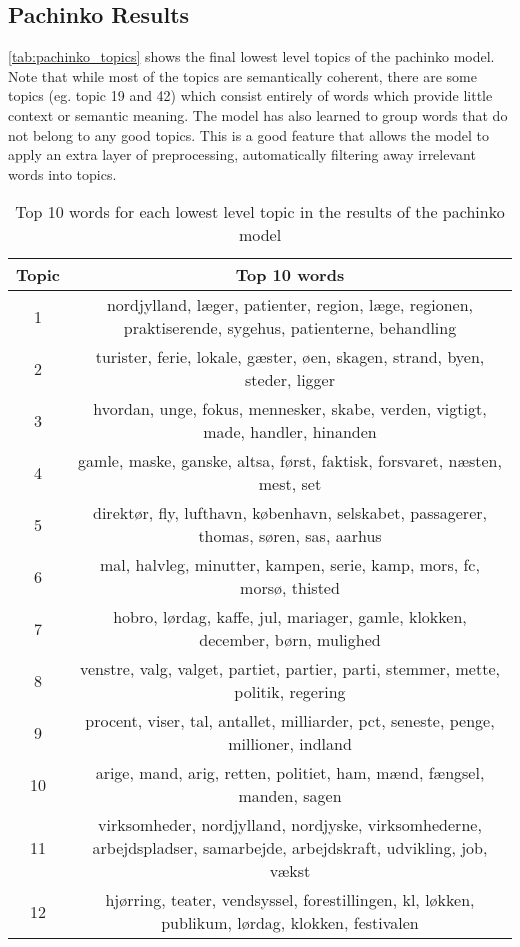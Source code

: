 \subsection{Pachinko Results}\label{app:pachinko_res}

\autoref{tab:pachinko_topics} shows the final lowest level topics of the pachinko model.
Note that while most of the topics are semantically coherent, there are some topics (eg. topic 19 and 42) which consist entirely of words which provide little context or semantic meaning.
The model has also learned to group words that do not belong to any good topics.
This is a good feature that allows the model to apply an extra layer of preprocessing, automatically filtering away irrelevant words into topics.

\begin{longtable}[c]{c | c}
		\caption{Top 10 words for each lowest level topic in the results of the pachinko model \label{tab:pachinko_topics}}\\
		Topic & Top 10 words \\
		\hline
		\endfirsthead
		1 & nordjylland, læger, patienter, region, læge, regionen, praktiserende, sygehus, patienterne, behandling \\
		2 & turister, ferie, lokale, gæster, øen, skagen, strand, byen, steder, ligger \\
		3 & hvordan, unge, fokus, mennesker, skabe, verden, vigtigt, made, handler, hinanden \\
		4 & gamle, maske, ganske, altsa, først, faktisk, forsvaret, næsten, mest, set \\
		5 & direktør, fly, lufthavn, københavn, selskabet, passagerer, thomas, søren, sas, aarhus \\
		6 & mal, halvleg, minutter, kampen, serie, kamp, mors, fc, morsø, thisted \\
		7 & hobro, lørdag, kaffe, jul, mariager, gamle, klokken, december, børn, mulighed \\
		8 & venstre, valg, valget, partiet, partier, parti, stemmer, mette, politik, regering \\
		9 & procent, viser, tal, antallet, milliarder, pct, seneste, penge, millioner, indland \\
		10 & arige, mand, arig, retten, politiet, ham, mænd, fængsel, manden, sagen \\
		11 & virksomheder, nordjylland, nordjyske, virksomhederne, arbejdspladser, samarbejde, arbejdskraft, udvikling, job, vækst \\
		12 & hjørring, teater, vendsyssel, forestillingen, kl, løkken, publikum, lørdag, klokken, festivalen \\

\end{longtable}
